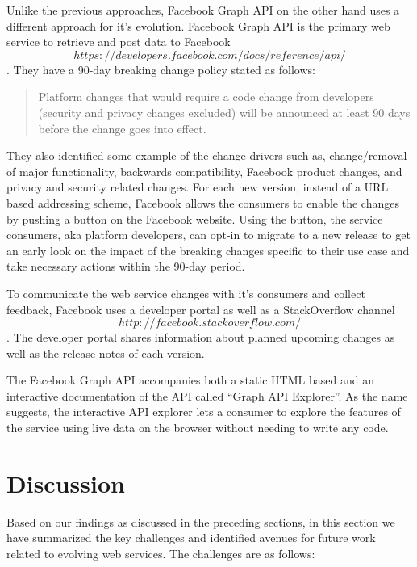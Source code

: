 \documentclass[runningheads,a4paper]{llncs}
\begin{document}
Unlike the previous approaches, Facebook Graph API on the other hand uses a different approach for it’s evolution. Facebook Graph API is the primary web service to retrieve and post data to Facebook \[https://developers.facebook.com/docs/reference/api/\]. They have a 90-day breaking change policy stated as follows:

\begin{quote}
Platform changes that would require a code change from developers (security and privacy changes excluded) will be announced at least 90 days before the change goes into effect.
\end{quote}

They also identified some example of the change drivers such as, change/removal of major functionality, backwards compatibility, Facebook product changes, and privacy and security related changes. For each new version, instead of a URL based addressing scheme, Facebook allows the consumers to enable the changes by pushing a button on the Facebook website. Using the button, the service consumers, aka platform developers, can opt-in to migrate to a new release to get an early look on the impact of the breaking changes specific to their use case and take necessary actions within the 90-day period.

To communicate the web service changes with it’s consumers and collect feedback, Facebook uses a developer portal as well as a StackOverflow channel \[http://facebook.stackoverflow.com/\]. The developer portal shares information about planned upcoming changes as well as the release notes of each version.

The Facebook Graph API accompanies both a static HTML based and an interactive documentation of the API called ``Graph API Explorer''. As the name suggests, the interactive API explorer lets a consumer to explore the features of the service using live data on the browser without needing to write any code.




\section{Discussion} %
\label{sec:discussion}

Based on our findings as discussed in the preceding sections, in this section we have summarized the key challenges and identified avenues for future work related to evolving web services. The challenges are as follows:
\end{document}
